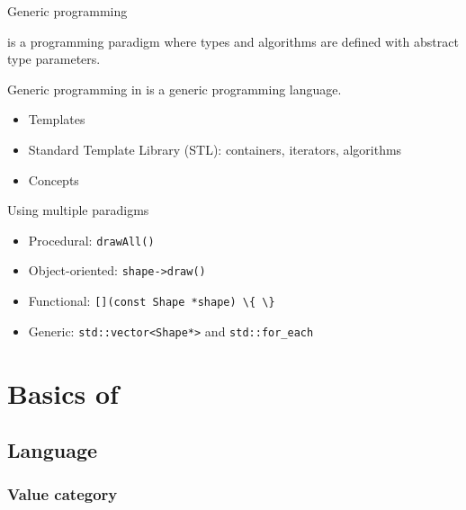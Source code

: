 \begin{frame}{Generic programming}{}
  \begin{definition}
     is a programming paradigm where types and algorithms are defined with abstract type parameters.
  \end{definition}
  \begin{block}{Generic programming in \CCLang}
    \CCLang is a generic programming language.
    \begin{itemize}
    \item
      Templates
    \item
      Standard Template Library (STL): containers, iterators, algorithms
    \item
      Concepts
    \end{itemize}
  \end{block}
\end{frame}

\begin{frame}{Using multiple paradigms}{}
  \begin{example}

    \begin{itemize}
    \item
      Procedural: \lstinline!drawAll()!
    \item
      Object-oriented: \lstinline!shape->draw()!
    \item
      Functional: \lstinline![](const Shape *shape) \{ \}!
    \item
      Generic: \lstinline!std::vector<Shape*>! and \lstinline!std::for_each!
    \end{itemize}
  \end{example}
\end{frame}


\section{Basics of \CCLang}

\subsection{Language}

\subsubsection{Value category}

